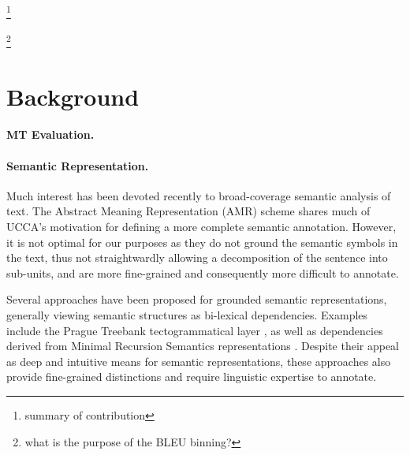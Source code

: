 \documentclass[11pt]{article}
\newcommand{\oa}[1]{\footnote{\color{red} #1}}
\begin{document}
\oa{summary of contribution}

\oa{what is the purpose of the BLEU binning?}

\section{Background}\label{sec:background}

\paragraph{MT Evaluation.}


\paragraph{Semantic Representation.}
Much interest has been devoted recently to broad-coverage semantic analysis of text.
The Abstract Meaning Representation (AMR) scheme \cite{banarescu2013abstract}
shares much of UCCA's motivation for defining a more complete semantic annotation.
However, it is not optimal for our purposes as they do not ground the semantic symbols
in the text, thus not straightwardly allowing a decomposition of the sentence into sub-units,
and are more fine-grained and consequently more difficult to annotate.

Several approaches have been proposed for grounded semantic representations,
generally viewing semantic structures as bi-lexical dependencies. Examples include
the Prague Treebank tectogrammatical layer \cite{hajic2012announcing}, as well as dependencies derived
from Minimal Recursion Semantics representations \cite{oepen2006discriminant}.
Despite their appeal as deep and intuitive means for semantic representations,
these approaches also provide fine-grained distinctions and require linguistic expertise to annotate.
\end{document}
